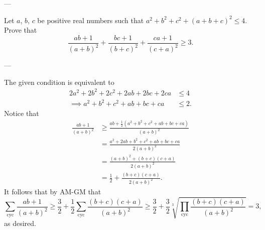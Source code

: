 
---

Let $a$, $b$, $c$ be positive real numbers such that $a^2+b^2+c^2+(a+b+c)^2\le 4$. Prove that \[\frac{ab+1}{(a+b)^2}+\frac{bc+1}{(b+c)^2}+\frac{ca+1}{(c+a)^2}\ge 3.\]

---

The given condition is equivalent to
\begin{align*}
    2a^2+2b^2+2c^2+2ab+2bc+2ca&\le 4\\
    \implies a^2+b^2+c^2+ab+bc+ca&\le 2.
\end{align*}
Notice that
\begin{align*}
    \frac{ab+1}{(a+b)^2}&\ge\frac{ab+\frac{1}{2}\left(a^2+b^2+c^2+ab+bc+ca\right)}{(a+b)^2}\\
    &=\frac{a^2+2ab+b^2+c^2+ab+bc+ca}{2(a+b)^2}\\
    &=\frac{(a+b)^2+(b+c)(c+a)}{2(a+b)^2}\\
    &=\frac{1}{2}+\frac{(b+c)(c+a)}{2(a+b)^2}.
\end{align*}
It follows that by AM-GM that\[\sum_{\mathrm{cyc}}\frac{ab+1}{(a+b)^2}\ge\frac{3}{2}+\frac{1}{2}\sum_{\mathrm{cyc}}\frac{(b+c)(c+a)}{(a+b)^2}\ge\frac{3}{2}+\frac{3}{2}\sqrt[3]{\prod_{\mathrm{cyc}}\frac{(b+c)(c+a)}{(a+b)^2}}=3,\]
as desired.

